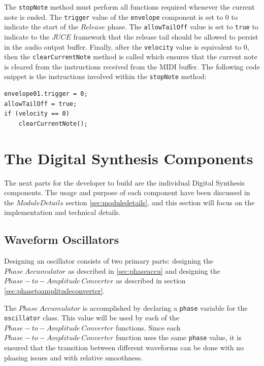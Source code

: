 \documentclass[a4paper,12pt]{report}
\begin{document}
The \texttt{stopNote} method must perform all functions required whenever the current note is ended. The \texttt{trigger} value of the \texttt{envelope} component is set to $0$ to indicate the start of the $Release$ phase. The \texttt{allowTailOff} value is set to \texttt{true} to indicate to the $JUCE$ framework that the release tail should be allowed to persist in the audio output buffer. Finally, after the \texttt{velocity} value is equivalent to $0$, then the \texttt{clearCurrentNote} method is called which ensures that the current note is cleared from the instructions received from the MIDI buffer. The following code snippet is the instructions involved within the \texttt{stopNote} method:

 \noindent\begin{minipage}{\linewidth} \begin{lstlisting}[caption={stopNote()},label={code:stopnote},captionpos=b]
envelope01.trigger = 0;
allowTailOff = true;
if (velocity == 0)
    clearCurrentNote();
\end{lstlisting} \end{minipage}


\section{The Digital Synthesis Components}
\label{sec:digitalsynthesiscomponents}
The next parts for the developer to build are the individual Digital Synthesis components. The usage and purpose of each component have been discussed in the $Module Details$ section \ref{sec:moduledetails}, and this section will focus on the implementation and technical details.

\subsection{Waveform Oscillators}
\label{subsec:waveformosc}
Designing an oscillator consists of two primary parts: designing the $Phase\ Accumulator$ as described in \ref{sec:phaseaccu} and designing the $Phase-to-Amplitude\ Converter$ as described in section \ref{sec:phasetoamplitudeconverter}.

The $Phase\ Accumulator$ is accomplished by declaring a \texttt{phase} variable for the \texttt{oscillator} class. This value will be used by each of the $Phase-to-Amplitude\ Converter$ functions. Since each $Phase-to-Amplitude\ Converter$ function uses the same \texttt{phase} value, it is ensured that the transition between different waveforms can be done with no phasing issues and with relative smoothness.
\end{document}
